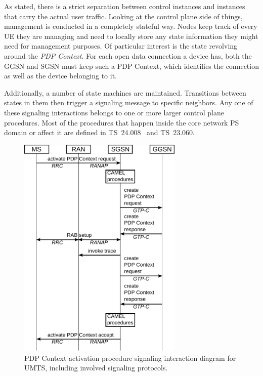 As stated, there is a strict separation between control instances and instances that carry the actual user traffic. Looking at the control plane side of things, management is conducted in a completely stateful way. Nodes keep track of every \gls{UE} they are managing and need to locally store any state information they might need for management purposes. Of particular interest is the state revolving around the \textit{\gls{PDP} Context}. For each open data connection a device has, both the \gls{GGSN} and \gls{SGSN} must keep such a \gls{PDP} Context, which identifies the connection as well as the device belonging to it.

Additionally, a number of state machines are maintained. Transitions between states in them then trigger a signaling message to specific neighbors. Any one of these signaling interactions belongs to one or more larger control plane procedures. Most of the procedures that happen inside the core network \gls{PS} domain or affect it are defined in \gls{TS}~24.008~\cite{3gpp.24.008} and \gls{TS}~23.060\cite{3gpp.23.060}.

\begin{figure}[htbp]
	\centering
	\includegraphics[width=0.7\textwidth]{images/pdp-context-activation-procedure.pdf}
	\caption{\gls{PDP} Context activation procedure signaling interaction diagram for \gls{UMTS}, including involved signaling protocols.}
\label{c4:fig:pdpcontextactivationinteraction}
\end{figure}

